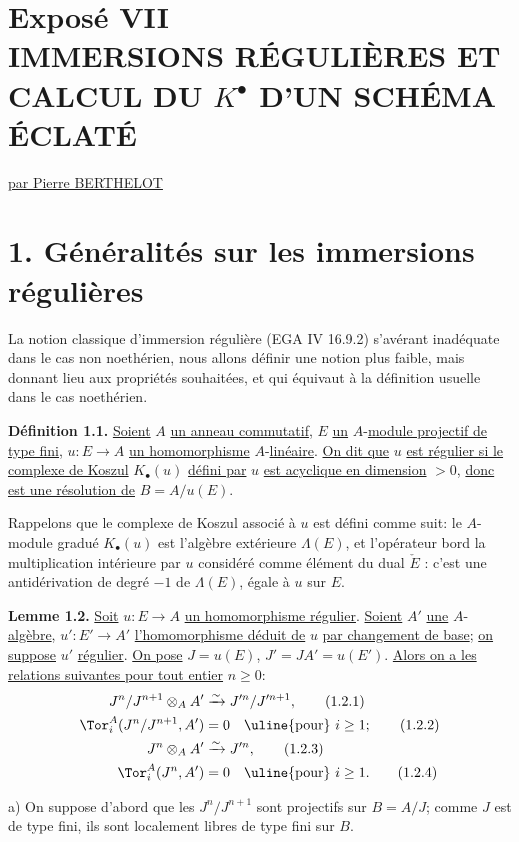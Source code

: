 
\renewcommand{\Sym}{\operatorname{Sym}}
\renewcommand{\Projz}{\operatorname{Proj}_0}
\section*{Exposé VII\\[3pt] IMMERSIONS RÉGULIÈRES ET CALCUL DU \texorpdfstring{$K^{\bullet}$}{K0} D'UN SCHÉMA ÉCLATÉ}
\begin{center}
\uline{par Pierre BERTHELOT}
\end{center}

\section*{1. Généralités sur les immersions régulières}

La notion classique d'immersion régulière (EGA IV 16.9.2) s'avérant inadéquate dans le cas non noethérien, nous allons définir une notion plus faible, mais donnant lieu aux propriétés souhaitées, et qui équivaut à la définition usuelle dans le cas noethérien.

\textbf{Définition 1.1.} \uline{Soient} $A$ \uline{un anneau commutatif}, $E$ \uline{un} $A$-\uline{module projectif de type fini}, $u:E\longrightarrow A$ \uline{un homomorphisme} $A$-\uline{linéaire}. \uline{On dit que} $u$ \uline{est régulier si le complexe de Koszul} $K_\bullet(u)$ \uline{défini par} $u$ \uline{est acyclique en dimension} $>0$, \uline{donc est une résolution de} $B=A/u(E)$.

Rappelons que le complexe de Koszul associé à $u$ est défini comme suit: le $A$-module gradué $K_\bullet(u)$ est l'algèbre extérieure $\Lambda(E)$, et l'opérateur bord la multiplication intérieure par $u$ considéré comme élément du dual $\check E$ : c'est une antidérivation de degré $-1$ de $\Lambda(E)$, égale à $u$ sur $E$.

\textbf{Lemme 1.2.} \uline{Soit} $u:E\longrightarrow A$ \uline{un homomorphisme régulier}. \uline{Soient} $A'$ \uline{une} $A$-\uline{algèbre}, $u':E'\longrightarrow A'$ \uline{l'homomorphisme déduit de} $u$ \uline{par changement de base}; \uline{on suppose} $u'$ \uline{régulier}. \uline{On pose} $J=u(E)$, $J'=JA'=u(E')$. \uline{Alors on a les relations suivantes pour tout entier} $n\geq0$:
\begin{align}
 J^n/J^{n+1}\otimes_AA'&\xrightarrow{\sim}J'^n/J'^{n+1}, \tag{1.2.1}\\
 \Tor_i^A(J^n/J^{n+1},A')&=0\quad\text{\uline{pour} }i\geq1; \tag{1.2.2}\\
 J^n\otimes_AA'&\xrightarrow{\sim}J'^n, \tag{1.2.3}\\
 \Tor_i^A(J^n,A')&=0\quad\text{\uline{pour} }i\geq1. \tag{1.2.4}
\end{align}

a) On suppose d'abord que les $J^n/J^{n+1}$ sont projectifs sur $B=A/J$; comme $J$ est de type fini, ils sont localement libres de type fini sur $B$.
